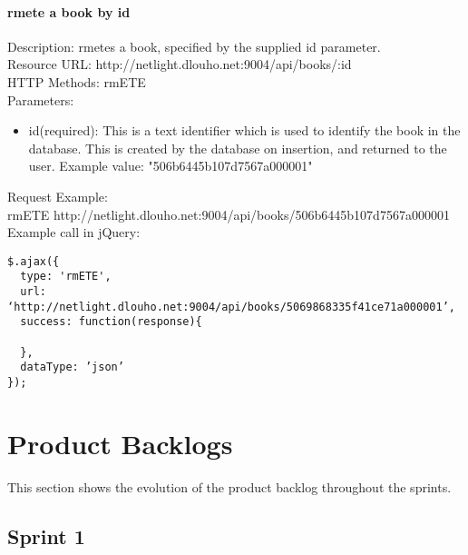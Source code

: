 \subsubsection{rmete a book by id}
Description: rmetes a book, specified by the supplied id parameter.	\\
\newline
Resource URL: http://netlight.dlouho.net:9004/api/books/:id 	\\
HTTP Methods: rmETE		\\
Parameters:
\begin{itemize}

\item id(required): This is a text identifier which is used to identify the book in the database. This is created by the database on insertion, and returned to the user. Example value: "506b6445b107d7567a000001"

\end{itemize}
Request Example:		\\
rmETE	http://netlight.dlouho.net:9004/api/books/506b6445b107d7567a000001	\\
\newline
Example call in jQuery:
\begin{verbatim}
$.ajax({
  type: 'rmETE',
  url: ‘http://netlight.dlouho.net:9004/api/books/5069868335f41ce71a000001’,
  success: function(response){

  },
  dataType: ’json’
});
\end{verbatim}

\clearpage

\chapter{Product Backlogs}

This section shows the evolution of the product backlog throughout the sprints.

\section{Sprint 1}
\label{sprint1pb}

